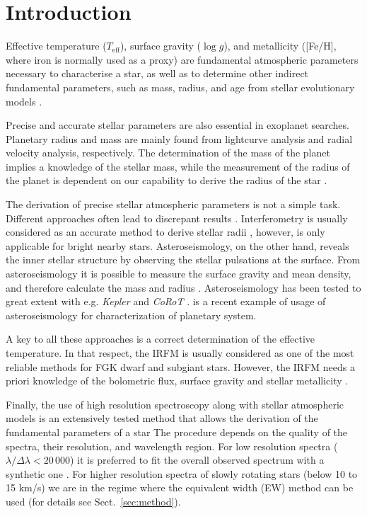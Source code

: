 \documentclass{aa}
\begin{document}
\section{Introduction}
\label{sec:introduction}

Effective temperature ($T_\mathrm{eff}$), surface gravity ($\log g$),
and metallicity ([Fe/H], where iron is normally used as a proxy)
are fundamental atmospheric parameters necessary to characterise a
star, as well as to determine other indirect fundamental parameters,
such as mass, radius, and age from stellar evolutionary models
\citep[e.g.][]{Girardi2000,Dotter2008,Baraffe2015}.

Precise and accurate stellar parameters are also essential in
exoplanet searches. Planetary radius and mass are mainly found from
lightcurve analysis and radial velocity analysis, respectively. The
determination of the mass of the planet implies a knowledge of the
stellar mass, while the measurement of the radius of the planet
is dependent on our capability to derive the radius of the star
\citep{Ammler2009,Torres2008,Torres2012}.

The derivation of precise stellar atmospheric parameters is not a simple
task. Different approaches often lead to discrepant results \citep[see
e.g.][]{Santos13}. Interferometry is usually considered as an accurate
method to derive stellar radii \citep[e.g.][]{Boyajian2012}, however,
is only applicable for bright nearby stars. Asteroseismology, on the
other hand, reveals the inner stellar structure by observing the stellar
pulsations at the surface. From asteroseismology it is possible to
measure the surface gravity and mean density, and therefore calculate
the mass and radius \citep[e.g.][]{Kjeldsen1995}. Asteroseismology has
been tested to great extent with e.g. \emph{Kepler} and \emph{CoRoT}
\citep{Michel2008,Huber2011,Huber2012}. \cite{Campante2015} is a recent
example of usage of asteroseismology for characterization of planetary
system.

A key to all these approaches is a correct determination of the
effective temperature. In that respect, the IRFM is usually
considered as one of the most reliable methods for FGK dwarf
and subgiant stars. However, the IRFM needs a priori knowledge
of the bolometric flux, surface gravity and stellar metallicity
\citep{Blackwell1977,Ramirez2005b,Casagrande2010}.

Finally, the use of high resolution spectroscopy along with stellar
atmospheric models is an extensively tested method that allows
the derivation of the fundamental parameters of a star \citep[see
e.g.][]{Santos13} The procedure depends on the quality of the spectra,
their resolution, and wavelength region. For low resolution spectra
($\lambda/\Delta\lambda < 20\,000$) it is preferred to fit the overall
observed spectrum with a synthetic one \citep[see e.g.][]{Recio2006}.
For higher resolution spectra of slowly rotating stars (below 10 to 15
\si{km/s}) we are in the regime where the equivalent width (EW) method
can be used (for details see Sect.~\ref{sec:method}).
\end{document}
